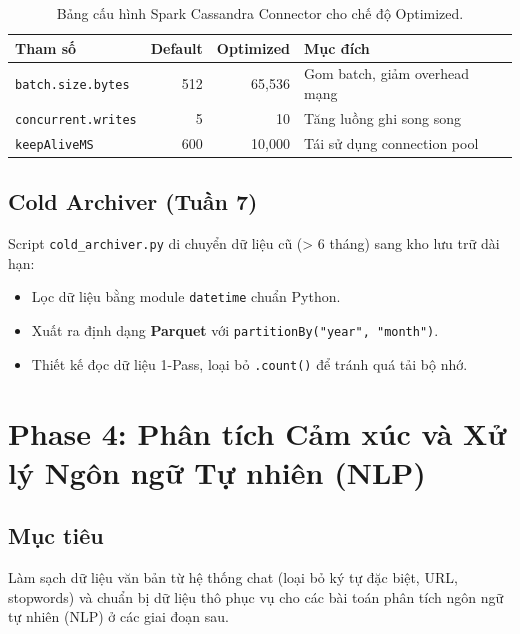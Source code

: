 \documentclass[12pt,a4paper]{article}
\begin{document}
\begin{table}[H]
\centering
\caption{Bảng cấu hình Spark Cassandra Connector cho chế độ Optimized.}
\label{tab:spark_config}
\begin{tabular}{lrrl}
\toprule
\textbf{Tham số} & \textbf{Default} & \textbf{Optimized} & \textbf{Mục đích} \\
\midrule
\texttt{batch.size.bytes} & 512 & 65,536 & Gom batch, giảm overhead mạng \\
\texttt{concurrent.writes} & 5 & 10 & Tăng luồng ghi song song \\
\texttt{keepAliveMS} & 600 & 10,000 & Tái sử dụng connection pool \\
\bottomrule
\end{tabular}
\end{table}

\subsection{Cold Archiver (Tuần 7)}

Script \texttt{cold\_archiver.py} di chuyển dữ liệu cũ (> 6 tháng) sang kho lưu trữ dài hạn:
\begin{itemize}[noitemsep]
    \item Lọc dữ liệu bằng module \texttt{datetime} chuẩn Python.
    \item Xuất ra định dạng \textbf{Parquet} với \texttt{partitionBy("year", "month")}.
    \item Thiết kế đọc dữ liệu 1-Pass, loại bỏ \texttt{.count()} để tránh quá tải bộ nhớ.
\end{itemize}

\newpage
\section{Phase 4: Phân tích Cảm xúc và Xử lý Ngôn ngữ Tự nhiên (NLP)}
\label{sec:phase4}

\subsection{Mục tiêu}
Làm sạch dữ liệu văn bản từ hệ thống chat (loại bỏ ký tự đặc biệt, URL, stopwords) và chuẩn bị dữ liệu thô phục vụ cho các bài toán phân tích ngôn ngữ tự nhiên (NLP) ở các giai đoạn sau.
\end{document}
